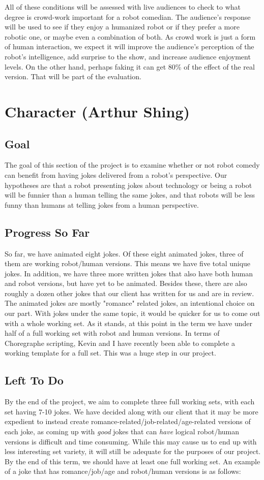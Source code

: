 \documentclass[onecolumn, draftclsnofoot,10pt, compsoc]{IEEEtran}
\begin{document}
All of these conditions will be assessed with live audiences to check to what degree is crowd-work important for a robot comedian. The audience's response will be used to see if they enjoy a humanized robot or if they prefer a more robotic one, or maybe even a combination of both. As crowd work is just a form of human interaction, we expect it will improve the audience's perception of the robot's intelligence, add surprise to the show, and increase audience enjoyment levels. On the other hand, perhaps faking it can get 80\% of the effect of the real version. That will be part of the evaluation.

\section{Character (Arthur Shing)}
\subsection{Goal}
The goal of this section of the project is to examine whether or not robot comedy can benefit from having jokes delivered from a robot's perspective. Our hypotheses are that a robot presenting jokes about technology or being a robot will be funnier than a human telling the same jokes, and that robots will be less funny than humans at telling jokes from a human perspective.
\subsection{Progress So Far}
So far, we have animated eight jokes. Of these eight animated jokes, three of them are working robot/human versions. This means we have five total unique jokes. In addition, we have three more written jokes that also have both human and robot versions, but have yet to be animated. Besides these, there are also roughly a dozen other jokes that our client has written for us and are in review. The animated jokes are mostly "romance" related jokes, an intentional choice on our part. With jokes under the same topic, it would be quicker for us to come out with a whole working set. As it stands, at this point in the term we have under half of a full working set with robot and human versions. In terms of Choregraphe scripting, Kevin and I have recently been able to complete a working template for a full set. This was a huge step in our project.
\subsection{Left To Do}
By the end of the project, we aim to complete three full working sets, with each set having 7-10 jokes. We have decided along with our client that it may be more expedient to instead create romance-related/job-related/age-related versions of each joke, as coming up with \textit{good} jokes that can \textit{have} logical robot/human versions is difficult and time consuming. While this may cause us to end up with less interesting set variety, it will still be adequate for the purposes of our project. By the end of this term, we should have at least one full working set. An example of a joke that has romance/job/age and robot/human versions is as follows:
\end{document}
